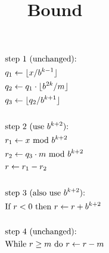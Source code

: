 \documentclass{article}
\title{Bound}
\date{}
\DeclarePairedDelimiter\floor{\lfloor}{\rfloor}
\begin{document}
\begin{align*}
    &\text{step 1 (unchanged): } \\ 
    &q_1 \leftarrow \floor{x / b ^{k-1}}\\
    &q_2 \leftarrow q_1 \cdot \floor{b^{2k} / m}\\
    &q_3 \leftarrow \floor{q_2 / b ^{k+1}}\\
    \\
    &\text{step 2 (use $b ^{k+2}$): } \\ 
    &r_1 \leftarrow x \text{ mod } b ^{k+2}\\
    &r_2 \leftarrow q_3 \cdot m \text{ mod } b ^{k+2}\\
    &r \leftarrow r_1 - r_2\\
    \\
    &\text{step 3 (also use $b ^{k+2}$): } \\ 
    &\text{If } r < 0 \text{ then } r \leftarrow r + b ^{k+2}\\
    \\
    &\text{step 4 (unchanged): } \\ 
    &\text{While } r \ge m \text{ do } r \leftarrow r - m\\
\end{align*}
\end{document}
